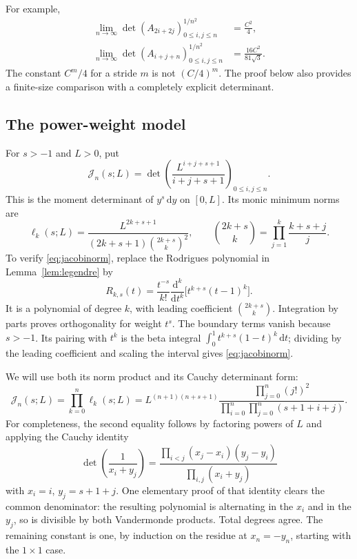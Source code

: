 \documentclass[11pt,a4paper]{article}
\numberwithin{equation}{section}
\theoremstyle{remark}\newtheorem{remark}[theorem]{Remark}
\newcommand{\J}{\mathcal J}
\newcommand{\dd}{\,\mathrm d}
\begin{document}
For example,
\begin{align}
 \lim_{n\to\infty}\det(A_{2i+2j})_{0\leq i,j\leq n}^{1/n^2}
   &=\frac{C^2}{4},\label{eq:stride2}\\
 \lim_{n\to\infty}\det(A_{i+j+n})_{0\leq i,j\leq n}^{1/n^2}
   &=\frac{16C^2}{81\sqrt3}.\label{eq:linear1}
\end{align}
The constant $C^m/4$ for a stride $m$ is not $(C/4)^m$. The proof below also
provides a finite-size comparison with a completely explicit determinant.

\subsection{The power-weight model}
For $s>-1$ and $L>0$, put
\begin{equation}\label{eq:Jdef}
 \J_n(s;L)=\det\left(\frac{L^{i+j+s+1}}{i+j+s+1}\right)_{0\leq i,j\leq n}.
\end{equation}
This is the moment determinant of $y^s\dd y$ on $[0,L]$.
Its monic minimum norms are
\begin{equation}\label{eq:jacobinorm}
 \ell_k(s;L)=\frac{L^{2k+s+1}}
 {(2k+s+1)\binom{2k+s}{k}^2},\qquad
 \binom{2k+s}{k}=\prod_{j=1}^k\frac{k+s+j}{j}.
\end{equation}
To verify \eqref{eq:jacobinorm}, replace the Rodrigues polynomial in
Lemma~\ref{lem:legendre} by
\[
 R_{k,s}(t)=\frac{t^{-s}}{k!}\frac{\mathrm d^k}{\mathrm dt^k}
        \bigl[t^{k+s}(t-1)^k\bigr].
\]
It is a polynomial of degree $k$, with leading coefficient
$\binom{2k+s}{k}$. Integration by parts proves orthogonality for weight $t^s$.
The boundary terms vanish because $s>-1$. Its pairing with $t^k$ is the beta
integral $\int_0^1t^{k+s}(1-t)^k\dd t$; dividing by the leading coefficient
and scaling the interval gives \eqref{eq:jacobinorm}.

We will use both its norm product and its Cauchy determinant form:
\begin{equation}\label{eq:Jexact}
 \J_n(s;L)=\prod_{k=0}^n\ell_k(s;L)
 =L^{(n+1)(n+s+1)}
   \frac{\prod_{j=0}^n(j!)^2}
        {\prod_{i=0}^n\prod_{j=0}^n(s+1+i+j)}.
\end{equation}
For completeness, the second equality follows by factoring powers of $L$
and applying the Cauchy identity
\[
 \det\left(\frac1{x_i+y_j}\right)
 =\frac{\prod_{i<j}(x_j-x_i)(y_j-y_i)}{\prod_{i,j}(x_i+y_j)}
\]
with $x_i=i$, $y_j=s+1+j$. One elementary proof of that identity clears the
common denominator: the resulting polynomial is alternating in the $x_i$
and in the $y_j$, so is divisible by both Vandermonde products. Total degrees
agree. The remaining constant is one, by induction on the residue at
$x_n=-y_n$, starting with the $1\times1$ case.
\end{document}
